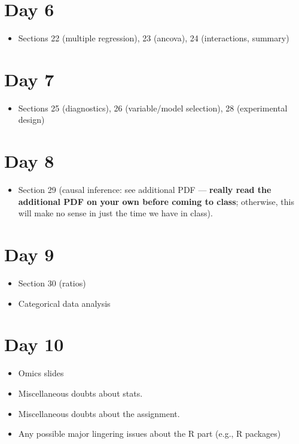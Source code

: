 \documentclass[12pt]{article}
\begin{document}
\section*{Day 6 }
\label{sec:org6f322e8}
\begin{itemize}
\item Sections 22 (multiple regression), 23 (ancova), 24 (interactions, summary)
\end{itemize}
\section*{Day 7 }
\label{sec:org2142285}
\begin{itemize}
\item Sections 25 (diagnostics), 26 (variable/model selection), 28 (experimental design)
\end{itemize}
\section*{Day 8 }
\label{sec:org3d49cf0}
\begin{itemize}
\item Section 29 (causal inference: see additional PDF --- \textbf{really read the additional PDF on your own before coming to class}; otherwise, this will make no sense in just the time we have in class).
\end{itemize}
\section*{Day 9}
\begin{itemize}
\item Section 30 (ratios)
\item Categorical data analysis
\end{itemize}

\section*{Day 10}
\begin{itemize}
\item Omics slides
\item Miscellaneous doubts about stats.
\item Miscellaneous doubts about the assignment.
\item Any possible major lingering issues about the R part (e.g., R packages)
\end{itemize}



\label{sec:org32ab79d}
\end{document}
